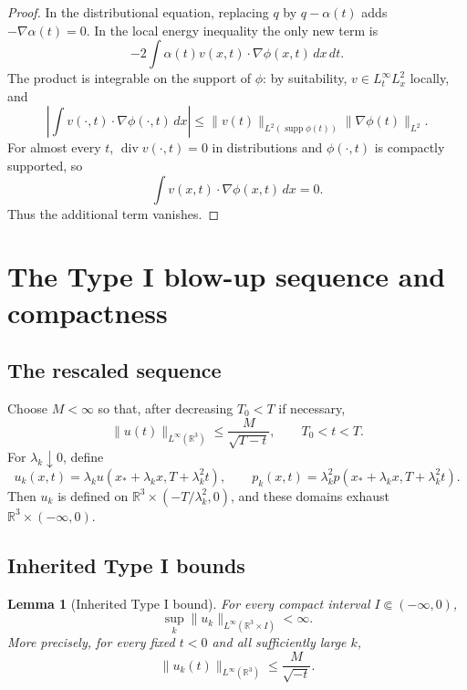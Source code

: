 \documentclass[11pt]{amsart}
\theoremstyle{plain}
\newtheorem{lemma}[lemma]{Lemma}
\theoremstyle{definition}
\theoremstyle{remark}
\numberwithin{equation}{section}
\newcommand{\R}{\mathbb R}
\newcommand{\supp}{\operatorname{supp}}
\newcommand{\divergence}{\operatorname{div}}
\begin{document}
\begin{proof}
In the distributional equation, replacing \(q\) by \(q-\alpha(t)\) adds
\(-\nabla\alpha(t)=0\).  In the local energy inequality the only new term is
\[
   -2\int \alpha(t)v(x,t)\cdot\nabla\phi(x,t)\,dx\,dt .
\]
The product is integrable on the support of \(\phi\): by suitability,
\(v\in L^\infty_tL^2_x\) locally, and
\[
   \left|\int v(\cdot,t)\cdot\nabla\phi(\cdot,t)\,dx\right|
   \le
   \|v(t)\|_{L^2(\supp\phi(t))}
   \|\nabla\phi(t)\|_{L^2}.
\]
For almost every \(t\), \(\divergence v(\cdot,t)=0\) in distributions and
\(\phi(\cdot,t)\) is compactly supported, so
\[
   \int v(x,t)\cdot\nabla\phi(x,t)\,dx=0 .
\]
Thus the additional term vanishes.
\end{proof}

\section{The Type I blow-up sequence and compactness}
\label{p1:sec:blowup-compactness}

\subsection{The rescaled sequence}

Choose \(M<\infty\) so that, after decreasing \(T_0<T\) if necessary,
\begin{equation}\label{p1:eq:type-I-pointwise}
   \|u(t)\|_{L^\infty(\R^3)}
   \le \frac{M}{\sqrt{T-t}},
   \qquad T_0<t<T.
\end{equation}
For \(\lambda_k\downarrow0\), define
\begin{equation}\label{p1:eq:rescaled-sequence}
   u_k(x,t)=\lambda_k u(x_*+\lambda_k x,T+\lambda_k^2t),
   \qquad
   p_k(x,t)=\lambda_k^2p(x_*+\lambda_k x,T+\lambda_k^2t).
\end{equation}
Then \(u_k\) is defined on \(\R^3\times(-T/\lambda_k^2,0)\), and these
domains exhaust \(\R^3\times(-\infty,0)\).

\subsection{Inherited Type I bounds}

\begin{lemma}[Inherited Type I bound]\label{p1:lem:inherited-bound}
For every compact interval \(I\Subset(-\infty,0)\),
\[
   \sup_k\|u_k\|_{L^\infty(\R^3\times I)}<\infty.
\]
More precisely, for every fixed \(t<0\) and all sufficiently large \(k\),
\[
   \|u_k(t)\|_{L^\infty(\R^3)}
   \le \frac{M}{\sqrt{-t}}.
\]
\end{lemma}
\end{document}
